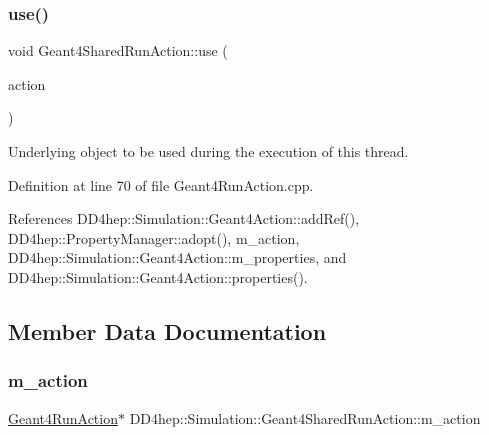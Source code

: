 \subsubsection{\texorpdfstring{use()}{use()}}
{\footnotesize\ttfamily void Geant4\+Shared\+Run\+Action\+::use (\begin{DoxyParamCaption}\item[{\hyperlink{class_d_d4hep_1_1_simulation_1_1_geant4_run_action}{Geant4\+Run\+Action} $\ast$}]{action }\end{DoxyParamCaption})\hspace{0.3cm}{\ttfamily [virtual]}}



Underlying object to be used during the execution of this thread. 



Definition at line 70 of file Geant4\+Run\+Action.\+cpp.



References D\+D4hep\+::\+Simulation\+::\+Geant4\+Action\+::add\+Ref(), D\+D4hep\+::\+Property\+Manager\+::adopt(), m\+\_\+action, D\+D4hep\+::\+Simulation\+::\+Geant4\+Action\+::m\+\_\+properties, and D\+D4hep\+::\+Simulation\+::\+Geant4\+Action\+::properties().



\subsection{Member Data Documentation}
\hypertarget{class_d_d4hep_1_1_simulation_1_1_geant4_shared_run_action_a2d197cf997162e46c7dc5aa51c46a6c7}{}\label{class_d_d4hep_1_1_simulation_1_1_geant4_shared_run_action_a2d197cf997162e46c7dc5aa51c46a6c7} 
\subsubsection{\texorpdfstring{m\+\_\+action}{m\_action}}
{\footnotesize\ttfamily \hyperlink{class_d_d4hep_1_1_simulation_1_1_geant4_run_action}{Geant4\+Run\+Action}$\ast$ D\+D4hep\+::\+Simulation\+::\+Geant4\+Shared\+Run\+Action\+::m\+\_\+action\hspace{0.3cm}{\ttfamily [protected]}}



